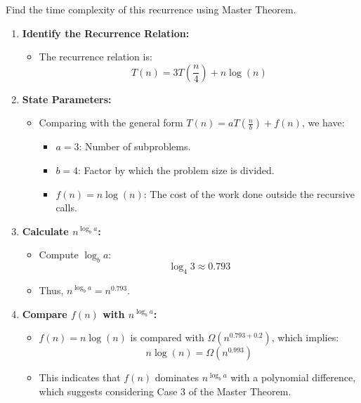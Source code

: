     \begin{example}
        Find the time complexity of this recurrence using Master Theorem.
        \begin{enumerate}
            \item \textbf{Identify the Recurrence Relation:}
            \begin{itemize}
                \item The recurrence relation is:
                \[
                T(n) = 3T\left(\frac{n}{4}\right) + n \log(n)
                \]
            \end{itemize}
            
            \item \textbf{State Parameters:}
            \begin{itemize}
                \item Comparing with the general form \( T(n) = aT\left(\frac{n}{b}\right) + f(n) \), we have:
                \begin{itemize}
                    \item \( a = 3 \): Number of subproblems.
                    \item \( b = 4 \): Factor by which the problem size is divided.
                    \item \( f(n) = n \log(n) \): The cost of the work done outside the recursive calls.
                \end{itemize}
            \end{itemize}
            
            \item \textbf{Calculate \( n^{\log_b a} \):}
            \begin{itemize}
                \item Compute \( \log_b a \):
                \[
                \log_4 3 \approx 0.793
                \]
                \item Thus, \( n^{\log_b a} = n^{0.793} \).
            \end{itemize}
            
            \item \textbf{Compare \( f(n) \) with \( n^{\log_b a} \):}
            \begin{itemize}
                \item \( f(n) = n \log(n) \) is compared with \( \Omega\left(n^{0.793 + 0.2}\right) \), which implies:
                \[
                n \log(n) = \Omega\left(n^{0.993}\right)
                \]
                \item This indicates that \( f(n) \) dominates \( n^{\log_b a} \) with a polynomial difference, which suggests considering Case 3 of the Master Theorem.
            \end{itemize}
            

\end{enumerate}
\end{example}
